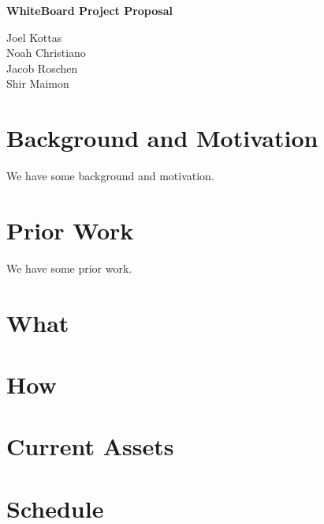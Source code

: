\documentclass[12pt]{article}
\begin{document}
\huge{\textbf{WhiteBoard Project Proposal}}

\vspace{10 pt}

\large{
    \noindent
    Joel Kottas \\
    Noah Christiano \\
    Jacob Roschen \\
    Shir Maimon \\
}

\vspace{10 pt}

\section{Background and Motivation}

We have some background and motivation.

\section{Prior Work}

We have some prior work.\cite{Hi}

\section{What}

\section{How}

\section{Current Assets}

\section{Schedule}

{}

\end{document}
